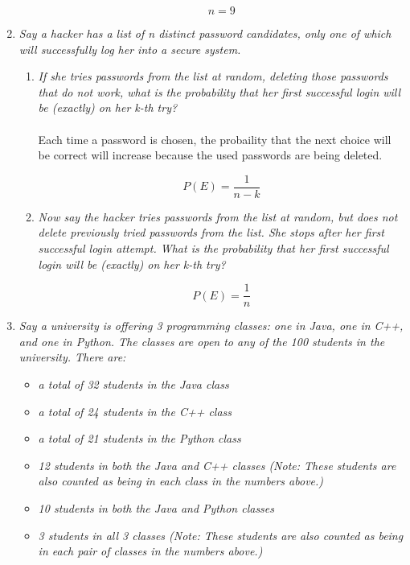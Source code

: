 \documentclass{article} %
\begin{document}
\begin{enumerate}
\begin{enumerate}
	$$n = 9$$
	
	\end{enumerate}
	
	\item \textit{Say a hacker has a list of n distinct password candidates, only one of which will successfully log her into a secure system.}\\
	\begin{enumerate}
	\item \textit{If she tries passwords from the list at random, deleting those passwords that do not work, what is the probability that her first successful login will be (exactly) on her k-th try?}\\
	\\
	Each time a password is chosen, the probaility that the next choice will be correct will increase because the used passwords are being deleted.
	
	$$P(E) = \frac{1}{n - k}$$
	
	\item \textit{Now say the hacker tries passwords from the list at random, but does not delete previously tried passwords from the list. She stops after her first successful login attempt. What is the probability that her first successful login will be (exactly) on her k-th try?}
	
	$$P(E) = \frac{1}{n}$$
	
	\end{enumerate}
	
	\item \textit{Say a university is offering 3 programming classes: one in Java, one in C++, and one in Python. The classes are open to any of the 100 students in the university. There are:}
	\begin{itemize}
	\item \textit{a total of 32 students in the Java class}	
	\item \textit{a total of 24 students in the C++ class}	
	\item \textit{a total of 21 students in the Python class}	
	\item \textit{12 students in both the Java and C++ classes (Note: These students are also counted as being in each class in the numbers above.)}
	\item \textit{10 students in both the Java and Python classes}
	\item \textit{3 students in all 3 classes (Note: These students are also counted as being in each pair of classes in the numbers above.)}			
	\end{itemize}
	

\end{enumerate}
\end{document}

